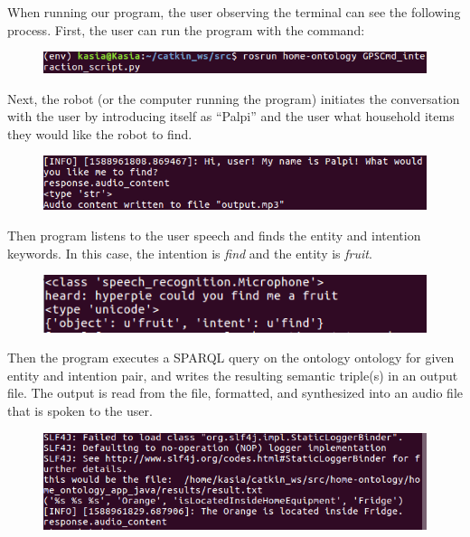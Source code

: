 \documentclass{article}
\begin{document}
When running our program, the user observing the terminal can see the 
following process. First, the user can run the program with the command:
\begin{figure}[H]
\includegraphics[width=\textwidth]{run_code.png}
\end{figure}

Next, the robot (or the computer running the program) initiates the 
conversation with the user by introducing itself as ``Palpi'' and the user
what household items they would like the robot to find.
\begin{figure}[H]
\includegraphics[width=\textwidth]{start.png}
\end{figure}

Then program listens to the user speech and finds the entity and intention
keywords. In this case, the intention is \textit{find} and the entity is
\textit{fruit}.
\begin{figure}[H]
\includegraphics[width=\textwidth]{find.png}
\end{figure}

Then the program executes a SPARQL query on the ontology ontology for given 
entity and intention pair, and writes the resulting semantic triple(s) in an
output file. The output is read from the file, formatted, and synthesized 
into an audio file that is spoken to the user.
\begin{figure}[H]
\includegraphics[width=\textwidth]{query.png}
\end{figure}
\end{document}
